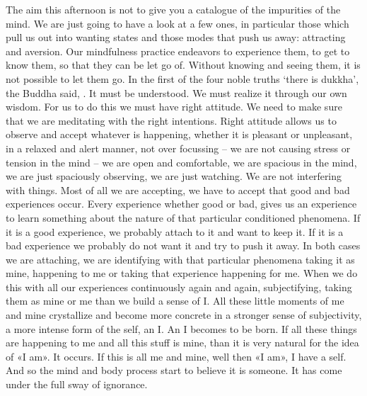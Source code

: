 \documentclass[letterpaper,10pt,english]{sphinxmanual}
\begin{document}
\sphinxAtStartPar
The aim this afternoon is not to give you a catalogue of the impurities
of  the  mind. We  are  just  going  to  have  a  look  at  a  few  ones,  in  particular
those  which  pull  us  out  into  wanting  states  and  those  modes  that  push  us
away: attracting and aversion. Our mindfulness practice endeavors to experience  them,  to  get  to  know  them,  so  that  they  can  be  let  go  of.  Without
knowing and seeing them, it is not possible to let them go. In the first of the
four noble truths ‘there is dukkha’, the Buddha said,
. It must be understood. We must realize it through our own wisdom.
For us to do this we must have right attitude. We need to make sure that we
are meditating with the right intentions. Right attitude allows us to observe
and accept whatever is happening, whether it is pleasant or unpleasant, in a
relaxed and alert manner, not over focussing – we are not causing stress or
tension in the mind – we are open and comfortable, we are spacious in the
mind,  we  are  just  spaciously  observing,  we  are  just  watching. We  are  not
interfering with things. Most of all we are accepting, we have to accept that
good  and  bad  experiences  occur.  Every  experience  whether  good  or  bad,
gives us an experience to learn something about the nature of that particular
conditioned phenomena. If it is a good experience, we probably attach to it
and want to keep it. If it is a bad experience we probably do not want it and
try to push it away. In both cases we are attaching, we are identifying with
that particular phenomena taking it as mine, happening to me or taking that
experience  happening  for  me.  When  we  do  this  with  all  our  experiences
continuously again and again, subjectifying, taking them as mine or me than
we build a sense of I. All these little moments of me and mine crystallize
and become more concrete in a stronger sense of subjectivity, a more intense
form of the self, an I. An I becomes to be born. If all these things are happening to me and all this stuff is mine, than it is very natural for the idea of
«I am». It occurs. If this is all me and mine, well then «I am», I have a self.
And so the mind and body process start to believe it is someone. It has come
under the full sway of ignorance.
\end{document}
